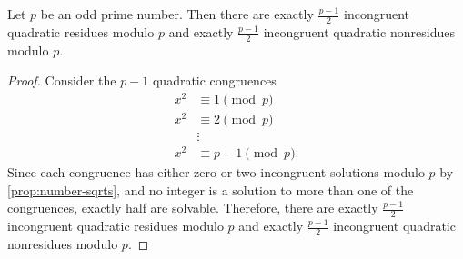 \documentclass{ximera}
\begin{document}
\begin{proposition}\label{prop:number-quad-residues}
	Let $p$ be an odd prime number. Then there are exactly $\frac{p-1}{2}$ incongruent quadratic residues modulo $p$ and exactly $\frac{p-1}{2}$ incongruent quadratic nonresidues modulo $p.$

    \begin{proof}
        Consider the $p-1$ quadratic congruences
        \begin{align*}
            x^2&\equiv 1\pmod{p}\\
            x^2&\equiv 2\pmod{p}\\
            &\vdots\\
            x^2&\equiv p-1\pmod{p}.
        \end{align*}
        Since each congruence has either zero or two incongruent solutions modulo $p$ by \cref{prop:number-sqrts}, and no integer is a solution to more than one of the congruences, exactly half are solvable. Therefore,  there are exactly $\frac{p-1}{2}$ incongruent quadratic residues modulo $p$ and exactly $\frac{p-1}{2}$ incongruent quadratic nonresidues modulo $p.$
    \end{proof}
\end{proposition}
\end{document}
